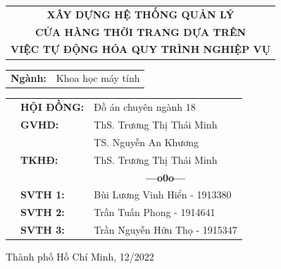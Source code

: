 \documentclass[a4paper, oneside, 12pt]{report}
\theoremstyle{definition}
\newcommand{\setupfont}[1]{\fontsize{#1}{#1}\selectfont}
\begin{document}
\begin{titlepage}
\vspace*{0.5cm}

\begin{center}
\setupfont{17pt}
	\begin{tabular}{c}
	\textbf{{XÂY DỰNG HỆ THỐNG QUẢN LÝ}}\\
	\textbf{{CỬA HÀNG THỜI TRANG DỰA TRÊN}}\\
	\textbf{{VIỆC TỰ ĐỘNG HÓA QUY TRÌNH NGHIỆP VỤ}}
	\end{tabular}
\end{center}

\vspace{0.5cm}


\begin{center}
	\setupfont{14pt}
	\begin{tabular}{rl}
		\textbf{Ngành:} & Khoa học máy tính
	\end{tabular}
\end{center}

\vspace{1cm}

\begin{table}[h]
	\setupfont{13pt}
\begin{tabular}{rll}
\hspace{5 cm}	& \textbf{HỘI ĐỒNG:} 	& Đồ án chuyên ngành 18   \\
				& \textbf{GVHD:} 		& ThS. Trương Thị Thái Minh\\
				&						& TS. Nguyễn An Khương\\
				& \textbf{TKHĐ:}		& ThS. Trương Thị Thái Minh\\
				&&\multicolumn{1}{c}{\bf---o0o---}\vspace{2mm}\\
				& \textbf{SVTH 1:} 		& Bùi Lương Vinh Hiển - 1913380       \\
				& \textbf{SVTH 2:} 		& Trần Tuấn Phong - 1914641       \\
				& \textbf{SVTH 3:} 		& Trần Nguyễn Hữu Thọ - 1915347       \\
\end{tabular}
\end{table}

\begin{center}
{\setupfont{12pt} Thành phố Hồ Chí Minh, 12/2022}
\end{center}
\end{titlepage}

\setupfont{13pt}

\clearpage
\thispagestyle{empty}
\hfill
\clearpage
\end{document}
